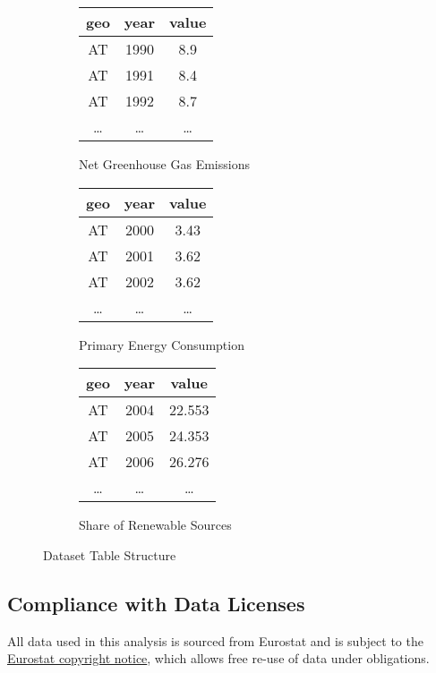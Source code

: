 \documentclass{article}
\begin{document}
\begin{figure}[h!]
    \centering
    \begin{subfigure}[b]{0.3\textwidth}
        \centering
        \begin{tabular}{c c c}
            geo & year & value \\
            \hline\hline
            AT & 1990 & 8.9 \\
            AT & 1991 & 8.4 \\
            AT & 1992 & 8.7 \\
            \dots & \dots & \dots
        \end{tabular}
        \caption{Net Greenhouse Gas Emissions}
        \label{tab:emissions}
    \end{subfigure}
    \hfill
    \begin{subfigure}[b]{0.3\textwidth}
        \centering
        \begin{tabular}{c c c}
            geo & year & value \\
            \hline\hline
            AT & 2000 & 3.43 \\
            AT & 2001 & 3.62 \\
            AT & 2002 & 3.62 \\
            \dots & \dots & \dots
        \end{tabular}
        \caption{Primary Energy Consumption}
        \label{tab:consumption}
    \end{subfigure}
    \hfill
    \begin{subfigure}[b]{0.3\textwidth}
        \centering
        \begin{tabular}{c c c}
            geo & year & value \\
            \hline\hline
            AT & 2004 & 22.553 \\
            AT & 2005 & 24.353 \\
            AT & 2006 & 26.276 \\
            \dots & \dots & \dots
        \end{tabular}
        \caption{Share of Renewable Sources}
        \label{tab:share}
    \end{subfigure}
    \caption{Dataset Table Structure}
\end{figure}

\subsection*{Compliance with Data Licenses}
All data used in this analysis is sourced from Eurostat and is subject to the
\href{https://ec.europa.eu/eurostat/about-us/policies/copyright}{Eurostat copyright notice},
which allows free re-use of data under obligations.
\end{document}
